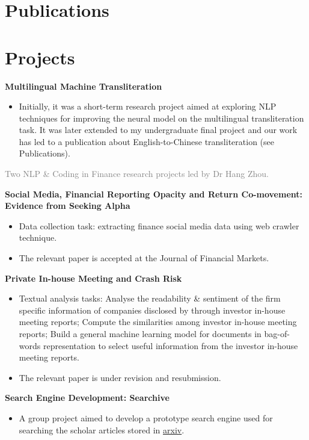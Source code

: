 \documentclass[%
               doublesided,
               paper=a4,
               fontsize=11pt
              ]{my-resume}
\begin{document}
\section[\faBook]{Publications}
\nocite{*}
\printbibliography[heading=none]

\section[\faFolder]{Projects}

\textbf{Multilingual Machine Transliteration}
\smallskip
\begin{itemize}
\item Initially, it was a short-term research project aimed at exploring NLP techniques for improving the neural model on the multilingual transliteration task. It was later extended to my undergraduate final project and our work has led to a publication about English-to-Chinese transliteration (see Publications).
\end{itemize}
\divider

\textcolor{gray}{Two NLP \& Coding in Finance research projects led by Dr Hang Zhou.}
\smallskip

\textbf{Social Media, Financial Reporting Opacity and Return Co-movement: Evidence from Seeking Alpha}
\smallskip
\begin{itemize}
    \item Data collection task: extracting finance social media data using web crawler technique.
    \item The relevant paper is accepted at the Journal of Financial Markets.
\end{itemize}
\smallskip

\textbf{Private In-house Meeting and Crash Risk}
\begin{itemize}
    \item Textual analysis tasks:  Analyse the readability \& sentiment of the firm specific information of companies disclosed by through investor in-house meeting reports; 
     Compute the similarities among investor in-house meeting reports;
     Build a general machine learning model for documents in bag-of-words representation to select useful information from the investor in-house meeting reports.
    \item The relevant paper is under revision and resubmission.
\end{itemize}
\divider

\textbf{Search Engine Development: Searchive}
\smallskip
\begin{itemize}
    \item A group project aimed to develop a prototype search engine used for searching the scholar articles stored in \href{https://arxiv.org/}{arxiv}. 
\end{itemize}
\divider
\end{document}
